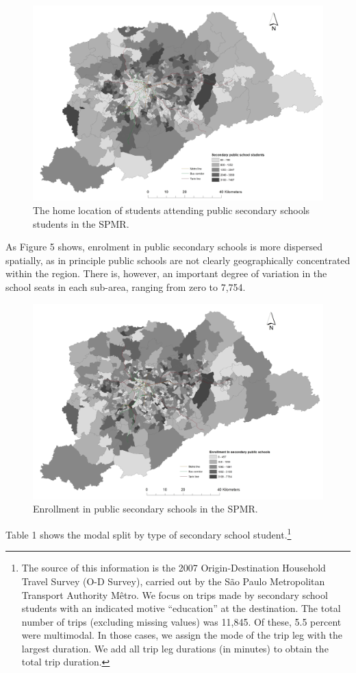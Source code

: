 \documentclass[3p,authoryear,preprint,review,12pt]{elsarticle}
\begin{document}
\begin{figure}[H]
\includegraphics[width=1\linewidth]{med_pu} \caption{The home location of students attending public secondary schools students in the SPMR.}\label{fig:students}
\end{figure}

As Figure 5 shows, enrolment in public secondary schools is more
dispersed spatially, as in principle public schools are not clearly
geographically concentrated within the region. There is, however, an
important degree of variation in the school seats in each sub-area,
ranging from zero to 7,754.
\begin{figure}
\includegraphics[width=0.7\linewidth]{enrol} \caption{Enrollment in public secondary schools in the SPMR.}\label{fig:unnamed-chunk-7}
\end{figure}
Table 1 shows the modal split by type of secondary school student.\footnote{The source of this information is the 2007 Origin-Destination Household Travel Survey (O-D Survey), carried out by the São Paulo Metropolitan Transport Authority Mêtro. We focus on   trips made by secondary school students with an indicated motive   ``education'' at the destination. The total number of trips (excluding missing values) was 11,845. Of these, 5.5 percent were multimodal. In those cases, we assign the mode of the trip leg with the largest duration. We add all trip leg durations (in minutes) to obtain the total trip duration.} 
  
\end{document}
